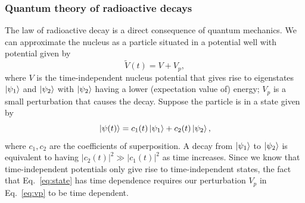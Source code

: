 \documentclass[nofootinbib,preprint,aps]{revtex4-1}
\begin{document}
        \subsubsection{Quantum theory of radioactive decays}
        The law of radioactive decay is a direct consequence of quantum mechanics.
        We can approximate the nucleus as a particle situated in a potential well with potential given by
        \begin{equation}
            \label{eq:vp}
            \tilde{V}(t) = V + V_p,
        \end{equation}
        where $V$ is the time-independent nucleus potential that gives rise to eigenstates $\ket{\psi_1}$
        and $\ket{\psi_2}$ with $\ket{\psi_2}$ having a lower (expectation value of) energy; $V_p$ is a small
        perturbation that causes the decay.
        Suppose the particle is in a state given by
        \begin{equation}
            \label{eq:state}
            \ket{\psi(t)} = c_1(t)\ket{\psi_1} + c_2(t)\ket{\psi_2},
        \end{equation}
        where $c_1,c_2$ are the coefficients of superposition.
        A decay from $\ket{\psi_1}$ to $\ket{\psi_2}$ is equivalent to
        having $|c_2(t)|^2\gg |c_1(t)|^2$ as time increases. Since we know that time-independent potentials
        only give rise to time-independent states, the fact that Eq.~\ref{eq:state} has time dependence requires
        our perturbation $V_p$ in Eq.~\ref{eq:vp} to be time dependent.
        
\end{document}
